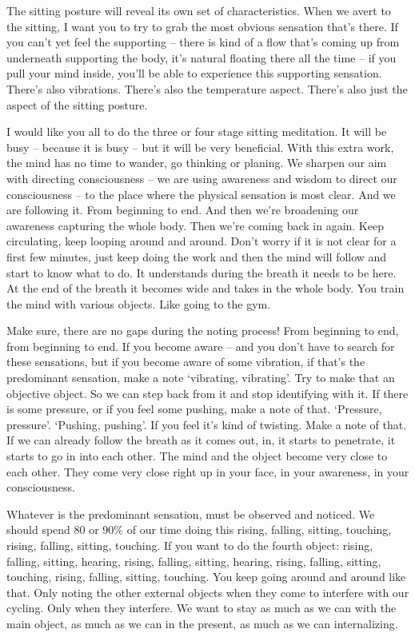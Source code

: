 \documentclass[letterpaper,10pt,english]{sphinxmanual}
\begin{document}
\sphinxAtStartPar
The sitting posture will reveal its own set of characteristics. When we
avert  to  the  sitting,  I  want  you  to  try  to  grab  the  most  obvious  sensation
that’s there. If you can’t yet feel the supporting – there is kind of a flow that’s
coming up from underneath supporting the body, it’s natural floating there
  all the time – if you pull your mind inside, you’ll be able to experience this
supporting  sensation. There’s  also  vibrations. There’s  also  the  temperature
aspect. There’s also just the aspect of the sitting posture.

\sphinxAtStartPar
I would like you all to do the three or four stage sitting meditation. It
will be busy – because it is busy – but it will be very beneficial. With this
extra  work,  the  mind  has  no  time  to  wander,  go  thinking  or  planing.  We
sharpen our aim with directing consciousness – we are using awareness and
wisdom to direct our consciousness – to the place where the physical sensation is most clear. And we are following it. From beginning to end. And
then we’re broadening our awareness capturing the whole body. Then we’re
coming  back  in  again.  Keep  circulating,  keep  looping  around  and  around.
Don’t worry if it is not clear for a first few minutes, just keep doing the work
and then the mind will follow and start to know what to do. It understands
during the breath it needs to be here. At the end of the breath it becomes wide
and takes in the whole body. You train the mind with various objects. Like
going to the gym.

\sphinxAtStartPar
Make sure, there are no gaps during the noting process! From beginning to end, from beginning to end. If you become aware – and you don’t
have to search for these sensations, but if you become aware of some vibration, if that’s the predominant sensation, make a note ‘vibrating, vibrating’.
Try to make that an objective object. So we can step back from it and stop
identifying with it. If there is some pressure, or if you feel some pushing,
make a note of that. ‘Pressure, pressure’. ‘Pushing, pushing’. If you feel it’s
kind of twisting. Make a note of that. If we can already follow the breath as
it comes out, in, it starts to penetrate, it starts to go in into each other. The
mind and the object become very close to each other. They come very close
right up in your face, in your awareness, in your consciousness.

\sphinxAtStartPar
Whatever is the predominant sensation, must be observed and noticed.
We  should  spend  80  or  90\%  of  our  time  doing  this  rising,  falling,  sitting,
touching, rising, falling, sitting, touching. If you want to do the fourth object:
rising, falling, sitting, hearing, rising, falling, sitting, hearing, rising, falling,
sitting,  touching,  rising,  falling,  sitting,  touching. You  keep  going  around
and around like that. Only noting the other external objects when they come
to interfere with our cycling. Only when they interfere. We want to stay as
  much as we can with the main object, as much as we can in the present, as
much as we can internalizing.
\end{document}
